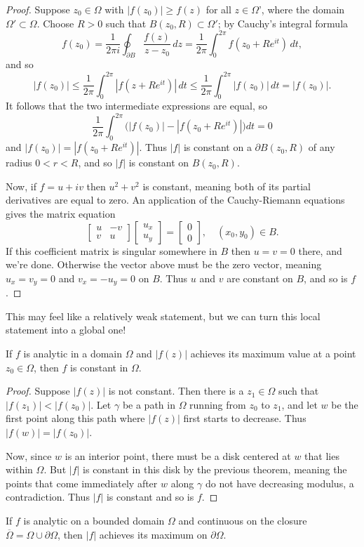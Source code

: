 \documentclass[../m136main.tex]{subfiles}
\begin{document}
\begin{proof}
    Suppose $z_0 \in \Omega$ with $|f(z_0)| \geq f(z)$ for all $z \in \Omega$', where the domain $\Omega' \subset \Omega$.
    Choose $R > 0$ such that $B(z_0, R) \subset \Omega'$; by Cauchy's integral formula
    \[ f(z_0) = \frac{1}{2\pi i} \oint_{\partial B} \frac{f(z)}{z - z_0} \,dz = \frac{1}{2\pi} \int_{0}^{2\pi} f(z_0 + Re^{it}) \,dt, \]
    and so
    \[ |f(z_0)| \leq \frac{1}{2\pi} \int_{0}^{2\pi} |f(z + Re^{it})| \,dt \leq \frac{1}{2\pi} \int_{0}^{2\pi} |f(z_0)| \,dt = |f(z_0)|. \]
    It follows that the two intermediate expressions are equal, so
    \[ \frac{1}{2\pi} \int_{0}^{2\pi} \Big( |f(z_0)| - |f(z_0 + Re^{it})| \Big) dt = 0 \]
    and $|f(z_0)| = |f(z_0 + Re^{it})|$.
    Thus $|f|$ is constant on a $\partial B(z_0, R)$ of any radius $0 < r < R$, and so $|f|$ is constant on $B(z_0, R)$.

    Now, if $f = u + iv$ then $u^2 + v^2$ is constant, meaning both of its partial derivatives are equal to zero.
    An application of the Cauchy-Riemann equations gives the matrix equation
    \[ \begin{bmatrix} u & -v \\ v & u \end{bmatrix} \begin{bmatrix} u_x \\ u_y \end{bmatrix} = \begin{bmatrix} 0 \\ 0 \end{bmatrix}, \quad (x_0, y_0) \in B. \]
    If this coefficient matrix is singular somewhere in $B$ then $u = v = 0$ there, and we're done.
    Otherwise the vector above must be the zero vector, meaning $u_x = v_y = 0$ and $v_x = -u_y = 0$ on $B$.
    Thus $u$ and $v$ are constant on $B$, and so is $f$.
\end{proof}

This may feel like a relatively weak statement, but we can turn this local statement into a global one!

\begin{corollary}[]
    If $f$ is analytic in a domain $\Omega$ and $|f(z)|$ achieves its maximum value at a point $z_0 \in \Omega$, then $f$ is constant in $\Omega$.
\end{corollary}

\begin{proof}
    Suppose $|f(z)|$ is not constant.
    Then there is a $z_1 \in \Omega$ such that $|f(z_1)| < |f(z_0)|$.
    Let $\gamma$ be a path in $\Omega$ running from $z_0$ to $z_1$, and let $w$ be the first point along this path where $|f(z)|$ first starts to decrease.
    Thus $|f(w)| = |f(z_0)|$.

    Now, since $w$ is an interior point, there must be a disk centered at $w$ that lies within $\Omega$.
    But $|f|$ is constant in this disk by the previous theorem, meaning the points that come immediately after $w$ along $\gamma$ do not have decreasing modulus, a contradiction.
    Thus $|f|$ is constant and so is $f$.
\end{proof}

\begin{corollary}[]
    If $f$ is analytic on a bounded domain $\Omega$ and continuous on the closure $\overline \Omega = \Omega \cup \partial \Omega$, then $|f|$ achieves its maximum on $\partial \Omega$.
\end{corollary}
\end{document}
